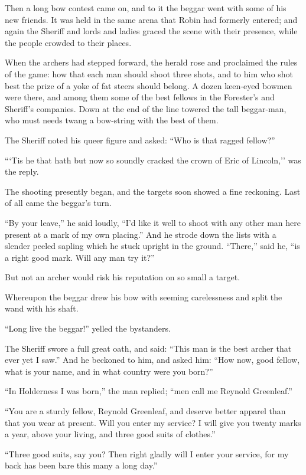 Then a long bow contest came on, and to it the beggar went with some of
his new friends. It was held in the same arena that Robin had formerly
entered; and again the Sheriff and lords and ladies graced the scene
with their presence, while the people crowded to their places.

When the archers had stepped forward, the herald rose and proclaimed the
rules of the game: how that each man should shoot three shots, and to
him who shot best the prize of a yoke of fat steers should belong. A
dozen keen-eyed bowmen were there, and among them some of the best
fellows in the Forester's and Sheriff's companies. Down at the end of
the line towered the tall beggar-man, who must needs twang a bow-string
with the best of them.

The Sheriff noted his queer figure and asked: ``Who is that ragged
fellow?''

```Tis he that hath but now so soundly cracked the crown of Eric of
Lincoln,'' was the reply.

The shooting presently began, and the targets soon showed a fine
reckoning. Last of all came the beggar's turn.

``By your leave,'' he said loudly, ``I'd like it well to shoot with any
other man here present at a mark of my own placing.'' And he strode down
the lists with a slender peeled sapling which he stuck upright in the
ground. ``There,'' said he, ``is a right good mark. Will any man try
it?''

But not an archer would risk his reputation on so small a target.

Whereupon the beggar drew his bow with seeming carelessness and split
the wand with his shaft.

``Long live the beggar!'' yelled the bystanders.

The Sheriff swore a full great oath, and said: ``This man is the best
archer that ever yet I saw.'' And he beckoned to him, and asked him:
``How now, good fellow, what is your name, and in what country were you
born?''

``In Holderness I was born,'' the man replied; ``men call me Reynold
Greenleaf.''

``You are a sturdy fellow, Reynold Greenleaf, and deserve better apparel
than that you wear at present. Will you enter my service? I will give
you twenty marks a year, above your living, and three good suits of
clothes.''

``Three good suits, say you? Then right gladly will I enter your
service, for my back has been bare this many a long day.''

